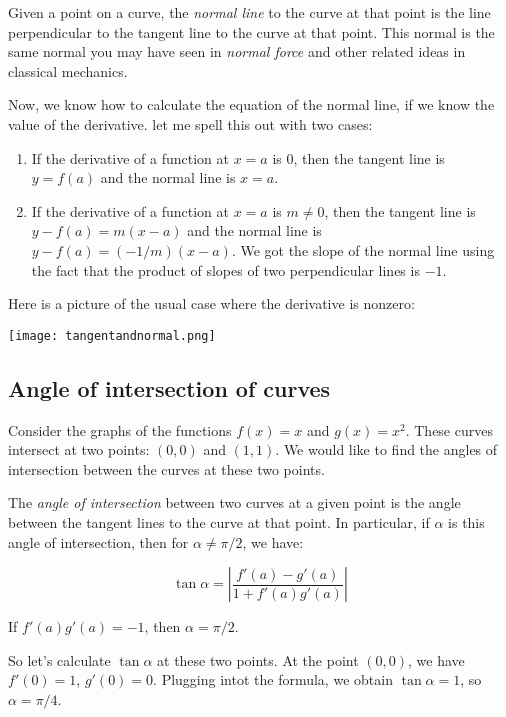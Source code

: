 \documentclass[10pt]{amsart}
\begin{document}
Given a point on a curve, the {\em normal line} to the curve at that
point is the line perpendicular to the tangent line to the curve at
that point. This normal is the same normal you may have seen in {\em
normal force} and other related ideas in classical mechanics.

Now, we know how to calculate the equation of the normal line, if we
know the value of the derivative. let me spell this out with two cases:

\begin{enumerate}

\item If the derivative of a function at $x = a$ is $0$, then the
  tangent line is $y = f(a)$ and the normal line is $x = a$.
\item If the derivative of a function at $x = a$ is $m \ne 0$, then
  the tangent line is $y - f(a) = m(x - a)$ and the normal line is $y
  - f(a) = (-1/m)(x - a)$. We got the slope of the normal line using
  the fact that the product of slopes of two perpendicular lines is $-1$.

\end{enumerate}

Here is a picture of the usual case where the derivative is nonzero:

\texttt{[image: tangentandnormal.png]}

\subsection{Angle of intersection of curves}

Consider the graphs of the functions $f(x) = x$ and $g(x) =
x^2$. These curves intersect at two points: $(0,0)$ and $(1,1)$. We
would like to find the angles of intersection between the curves at
these two points.

The {\em angle of intersection} between two curves at a given point is
the angle between the tangent lines to the curve at that point. In
particular, if $\alpha$ is this angle of intersection, then for
$\alpha \ne \pi/2$, we have:

$$\tan \alpha = \left| \frac{f'(a) - g'(a)}{1 + f'(a)g'(a)} \right|$$

If $f'(a)g'(a) = -1$, then $\alpha = \pi/2$.

So let's calculate $\tan \alpha$ at these two points. At the point
$(0,0)$, we have $f'(0) = 1$, $g'(0) = 0$. Plugging intot the formula,
we obtain $\tan \alpha = 1$, so $\alpha = \pi/4$.
\end{document}
